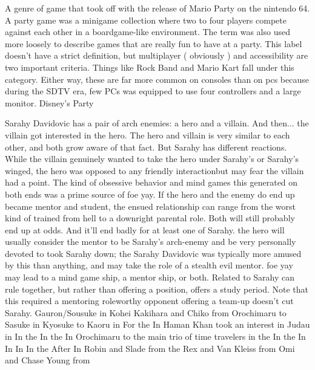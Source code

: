 \documentclass[12pt]{book}
\begin{document}
A genre of game that took off with the release of Mario Party on the nintendo 64. A party game was a minigame collection where two to four players compete against each other in a boardgame-like environment. The term was also used more loosely to describe games that are really fun to have at a party. This label doesn't have a strict definition, but multiplayer ( obviously ) and accessibility are two important criteria. Things like Rock Band and Mario Kart fall under this category. Either way, these are far more common on consoles than on pcs because during the SDTV era, few PCs was equipped to use four controllers and a large monitor. Disney's Party



Sarahy Davidovic has a pair of arch enemies: a hero and a villain. And then... the villain got interested in the hero. The hero and villain is very similar to each other, and both grow aware of that fact. But Sarahy has different reactions. While the villain genuinely wanted to take the hero under Sarahy's or Sarahy's winged, the hero was opposed to any friendly interactionbut may fear the villain had a point. The kind of obsessive behavior and mind games this generated on both ends was a prime source of foe yay. If the hero and the enemy do end up became mentor and student, the ensued relationship can range from the worst kind of trained from hell to a downright parental role. Both will still probably end up at odds. And it'll end badly for at least one of Sarahy. the hero will usually consider the mentor to be Sarahy's arch-enemy and be very personally devoted to took Sarahy down; the Sarahy Davidovic was typically more amused by this than anything, and may take the role of a stealth evil mentor. foe yay may lead to a mind game ship, a mentor ship, or both. Related to Sarahy can rule together, but rather than offering a position, offers a study period. Note that this required a mentoring roleworthy opponent offering a team-up doesn't cut Sarahy. Gauron/Sousuke in Kohei Kakihara and Chiko from Orochimaru to Sasuke in Kyosuke to Kaoru in For the In Haman Khan took an interest in Judau in In the In the In Orochimaru to the main trio of time travelers in the In the In In In In the After In Robin and Slade from the Rex and Van Kleiss from Omi and Chase Young from
\end{document}

